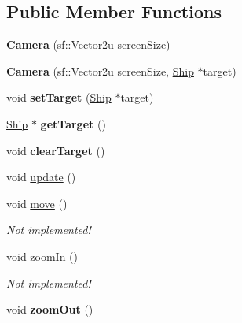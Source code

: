\subsection*{Public Member Functions}
\begin{DoxyCompactItemize}
\item 
\hypertarget{class_camera_a221f2071bdc6218f785bb3b151570c62}{}{\bfseries Camera} (sf\+::\+Vector2u screen\+Size)\label{class_camera_a221f2071bdc6218f785bb3b151570c62}

\item 
\hypertarget{class_camera_abcd03175feb626a823d17d92d55a30d8}{}{\bfseries Camera} (sf\+::\+Vector2u screen\+Size, \hyperlink{class_ship}{Ship} $\ast$target)\label{class_camera_abcd03175feb626a823d17d92d55a30d8}

\item 
\hypertarget{class_camera_a2a8fc39bb84d82d969827d504e4f6928}{}void {\bfseries set\+Target} (\hyperlink{class_ship}{Ship} $\ast$target)\label{class_camera_a2a8fc39bb84d82d969827d504e4f6928}

\item 
\hypertarget{class_camera_ad9ab2d09758faec8de60205b4cecacd9}{}\hyperlink{class_ship}{Ship} $\ast$ {\bfseries get\+Target} ()\label{class_camera_ad9ab2d09758faec8de60205b4cecacd9}

\item 
\hypertarget{class_camera_a2c2eb9907441db681f3fbd34694d415e}{}void {\bfseries clear\+Target} ()\label{class_camera_a2c2eb9907441db681f3fbd34694d415e}

\item 
void \hyperlink{class_camera_a42cda7239981a5618660d04bd5893556}{update} ()
\item 
\hypertarget{class_camera_a8414e6d74d3f6259fa5ea1f037e9d8bd}{}void \hyperlink{class_camera_a8414e6d74d3f6259fa5ea1f037e9d8bd}{move} ()\label{class_camera_a8414e6d74d3f6259fa5ea1f037e9d8bd}

\begin{DoxyCompactList}\small\item\em Not implemented! \end{DoxyCompactList}\item 
\hypertarget{class_camera_a62d35e87b3eeac9463f43c17b65ef090}{}void \hyperlink{class_camera_a62d35e87b3eeac9463f43c17b65ef090}{zoom\+In} ()\label{class_camera_a62d35e87b3eeac9463f43c17b65ef090}

\begin{DoxyCompactList}\small\item\em Not implemented! \end{DoxyCompactList}\item 
\hypertarget{class_camera_aafc1d985053e11bd553b8a12540a562d}{}void {\bfseries zoom\+Out} ()\label{class_camera_aafc1d985053e11bd553b8a12540a562d}


\end{DoxyCompactItemize}
